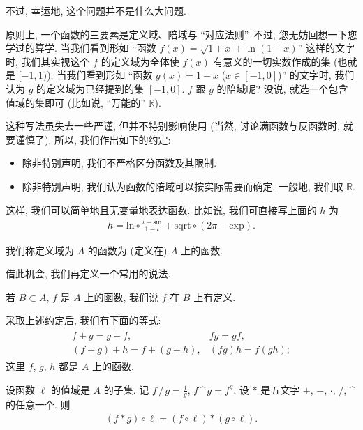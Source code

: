 不过, 幸运地, 这个问题并不是什么大问题.

原则上, 一个函数的三要素是定义域、陪域与 ``对应法则''. 不过, 您无妨回想一下您学过的算学. 当我们看到形如 ``函数 $f(x) = \sqrt{1 + x} + \operatorname{ln} {(1 - x)}$'' 这样的文字时, 我们其实视这个 $f$ 的定义域为全体使 $f(x)$ 有意义的一切实数作成的集 (也就是 $[-1, 1)$); 当我们看到形如 ``函数 $g(x) = 1 - x$ ($x \in [-1, 0]$)'' 的文字时, 我们认为 $g$ 的定义域为已经提到的集 $[-1, 0]$. $f$ 跟 $g$ 的陪域呢? 没说, 就选一个包含值域的集即可 (比如说, ``万能的'' $\mathbb{R}$).

这种写法虽失去一些严谨, 但并不特别影响使用 (当然, 讨论满函数与反函数时, 就要谨慎了). 所以, 我们作出如下的约定:
\begin{itemize}
    \item 除非特别声明, 我们不严格区分函数及其限制.
    \item 除非特别声明, 我们认为函数的陪域可以按实际需要而确定. 一般地, 我们取 $\mathbb{R}$.
\end{itemize}
这样, 我们可以简单地且无变量地表达函数. 比如说, 我们可直接写上面的 $h$ 为
\begin{align*}
    h = {\mathrm{ln}} \circ \frac{\iota - \mathrm{sin}}{1 - \iota} + \mathrm{sqrt} \circ (2\pi - \mathrm{exp}).
\end{align*}

\begin{definition}
    我们称定义域为 $A$ 的函数为 (定义在) $A$ 上的函数.
\end{definition}

借此机会, 我们再定义一个常用的说法.

\begin{definition}
    若 $B \subset A$, $f$ 是 $A$ 上的函数, 我们说 $f$ 在 $B$ 上有定义.
\end{definition}

采取上述约定后, 我们有下面的等式:
\begin{align*}
    \begin{array}{ll}
        f + g = g + f,             & fg = gf,       \\
        (f + g) + h = f + (g + h), & (fg)h = f(gh);
    \end{array}
\end{align*}
这里 $f$, $g$, $h$ 都是 $A$ 上的函数.

设函数 $\ell$ 的值域是 $A$ 的子集. 记 $f \, / \, g = \frac{f}{g}$, $f \, \text{\textasciicircum} \, g = f^g$. 设 $\ast$ 是五文字 $+$, $-$, $\cdot$, $/$, $\text{\textasciicircum}$ 的任意一个. 则
\begin{align*}
    (f \ast g) \circ \ell = (f \circ \ell) \ast (g \circ \ell).
\end{align*}

